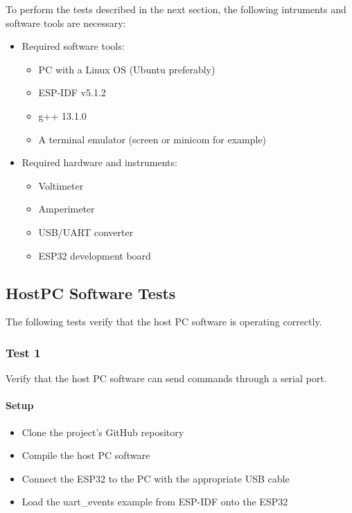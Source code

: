 \documentclass[10pt,twocolumn,letterpaper]{article}
\begin{document}
To perform the tests described in the next section, the following intruments and software tools are necessary:

\begin{itemize}
  \item Required software tools:
  \begin{itemize}
    \item PC with a Linux OS (Ubuntu preferably)
    \item ESP-IDF v5.1.2
    \item g++ 13.1.0
    \item A terminal emulator (screen or minicom for example)
  \end{itemize}

  \item Required hardware and instruments:
  \begin{itemize}
    \item Voltimeter
    \item Amperimeter
    \item USB/UART converter
    \item ESP32 development board
  \end{itemize}
\end{itemize}

\subsection{HostPC Software Tests}

The following tests verify that the host PC software is operating correctly.

\subsubsection{Test 1}

Verify that the host PC software can send commands through a serial port.

\paragraph{Setup}
\begin{itemize}
  \item Clone the project's GitHub repository \cite{mygit}
  \item Compile the host PC software
  \item Connect the ESP32 to the PC with the appropriate USB cable
  \item Load the uart\_events example from ESP-IDF onto the ESP32
\end{itemize}
\end{document}
